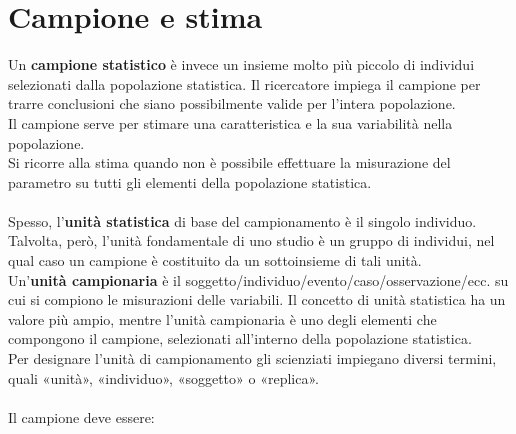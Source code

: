 \documentclass[drafts, 10pt]{book}
\begin{document}
\section{Campione e stima}
Un \textbf{campione statistico} è invece un insieme molto più piccolo di individui selezionati dalla popolazione statistica. Il ricercatore impiega il campione per trarre conclusioni che siano possibilmente valide per l'intera popolazione. 
\\
Il campione serve per stimare una caratteristica e la sua variabilità nella popolazione.
\\
Si ricorre alla stima quando non è possibile effettuare la misurazione del parametro su tutti gli elementi della popolazione statistica.
\\
\\
Spesso, l'\textbf{unità statistica} di base del campionamento è il singolo individuo. Talvolta, però, l'unità fondamentale di uno studio è un gruppo di individui, nel qual caso un campione è costituito da un sottoinsieme di tali unità. 
\\
Un’\textbf{unità campionaria} è il soggetto/individuo/evento/caso/osservazione/ecc. su cui si compiono le misurazioni delle variabili. Il concetto di unità statistica ha un valore più ampio, mentre l’unità campionaria è uno degli elementi che compongono il campione, selezionati all’interno della popolazione statistica.
\\
Per designare l'unità di campionamento gli scienziati impiegano diversi termini, quali «unità», «individuo», «soggetto» o «replica».
\\
\\
Il campione deve essere:
\end{document}
